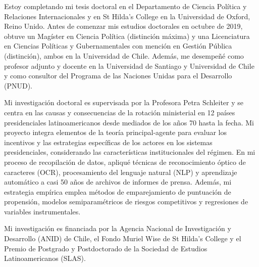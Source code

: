 




\vspace{3mm}

\begin{cvparagraph}

Estoy completando mi tesis doctoral en el Departamento de Ciencia Política y Relaciones Internacionales y en St Hilda’s College en la Universidad de Oxford, Reino Unido.  Antes de comenzar mis estudios doctorales en octubre de 2019, obtuve un Magíster en Ciencia Política (distinción máxima) y una Licenciatura en Ciencias Políticas y Gubernamentales con mención en Gestión Pública (distinción), ambos en la Universidad de Chile. Además, me desempeñé como profesor adjunto y docente en la Universidad de Santiago y Universidad de Chile y como consultor del Programa de las Naciones Unidas para el Desarrollo (PNUD).

Mi investigación doctoral es supervisada por la Profesora Petra Schleiter y se centra en las causas y consecuencias de la rotación ministerial en 12 países presidenciales latinoamericanos desde mediados de los años 70 hasta la fecha. Mi proyecto integra elementos de la teoría principal-agente para evaluar los incentivos y las estrategias específicas de los actores en los sistemas presidenciales, considerando las características institucionales del régimen. En mi proceso de recopilación de datos, apliqué técnicas de reconocimiento óptico de caracteres (OCR), procesamiento del lenguaje natural (NLP) y aprendizaje automático a casi 50 años de archivos de informes de prensa. Además, mi estrategia empírica emplea métodos de emparejamiento de puntuación de propensión, modelos semiparamétricos de riesgos competitivos y regresiones de variables instrumentales.

Mi investigación es financiada por la Agencia Nacional de Investigación y Desarrollo (ANID) de Chile, el Fondo Muriel Wise de St Hilda's College y el Premio de Postgrado y Postdoctorado de la Sociedad de Estudios Latinoamericanos (SLAS).
\vspace{1mm}
\end{cvparagraph}